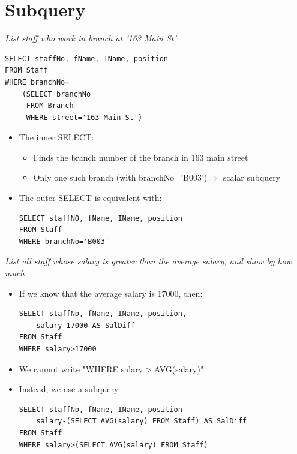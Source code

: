 \documentclass{article}[18pt]
\begin{document}
\section{Subquery}
\textit{List staff who work in branch at '163 Main St'}
\begin{verbatim}
SELECT staffNo, fName, IName, position
FROM Staff
WHERE branchNo=
	(SELECT branchNo
	 FROM Branch
	 WHERE street='163 Main St')
\end{verbatim}
\begin{itemize}
	\item The inner SELECT:
	\begin{itemize}
		\item Finds the branch number of the branch in 163 main street
		\item Only one such branch (with branchNo='B003')$\Rightarrow$ scalar subquery
	\end{itemize}
	\item The outer SELECT is equivalent with:
	\begin{verbatim}
SELECT staffNO, fName, IName, position
FROM Staff
WHERE branchNo='B003'
	\end{verbatim}
\end{itemize}
\newpage
\textit{List all staff whose salary is greater than the average salary, and show by how much}
\begin{itemize}
	\item If we know that the average salary is 17000, then:
	\begin{verbatim}
SELECT staffNo, fName, IName, position,	
	salary-17000 AS SalDiff
FROM Staff
WHERE salary>17000
	\end{verbatim}
	\item We cannot write "WHERE salary$>$AVG(salary)"
	\item Instead, we use a subquery
	\begin{verbatim}
SELECT staffNo, fName, IName, position
	salary-(SELECT AVG(salary) FROM Staff) AS SalDiff
FROM Staff
WHERE salary>(SELECT AVG(salary) FROM Staff)
	\end{verbatim}
\end{itemize}
\end{document}
